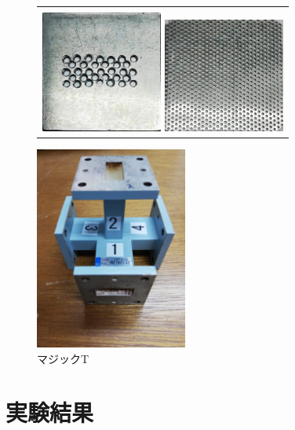 \begin{figure}[htpb]
\begin{tabular}{c}
    \\
    \\

    \begin{minipage}{0.50\hsize}
      \centering
      \includegraphics[keepaspectratio, width=4cm]{./data/5.png}
      \caption{}
      \end{minipage}

      \begin{minipage}{0.50\hsize}
      \centering
      \includegraphics[keepaspectratio, width=4cm]{./data/6.png}
      \caption{}
      \end{minipage}
  \end{tabular}
\end{figure}

\begin{figure}
  \centering
  \includegraphics[width=5cm]{./data/magicT.jpg}
  \caption{マジックT}
\end{figure}


\newpage
\section{実験結果}
